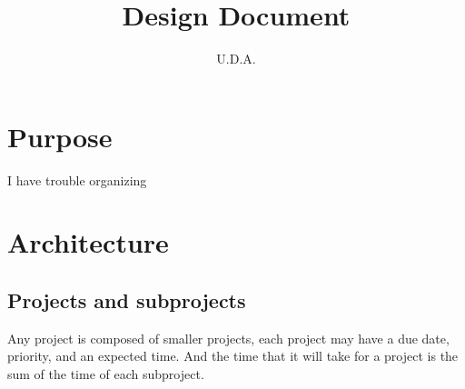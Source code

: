 \documentclass{article}
\title{Design Document}
\author{U.D.A.}
\begin{document}
\maketitle
\newpage


\section{Purpose}
I have trouble organizing

\section{Architecture}
\subsection{Projects and subprojects}
Any project is composed of smaller projects, each project may have a due date, priority, and an expected time.
And the time that it will take for a project is the sum of the time of each subproject.
\end{document}
